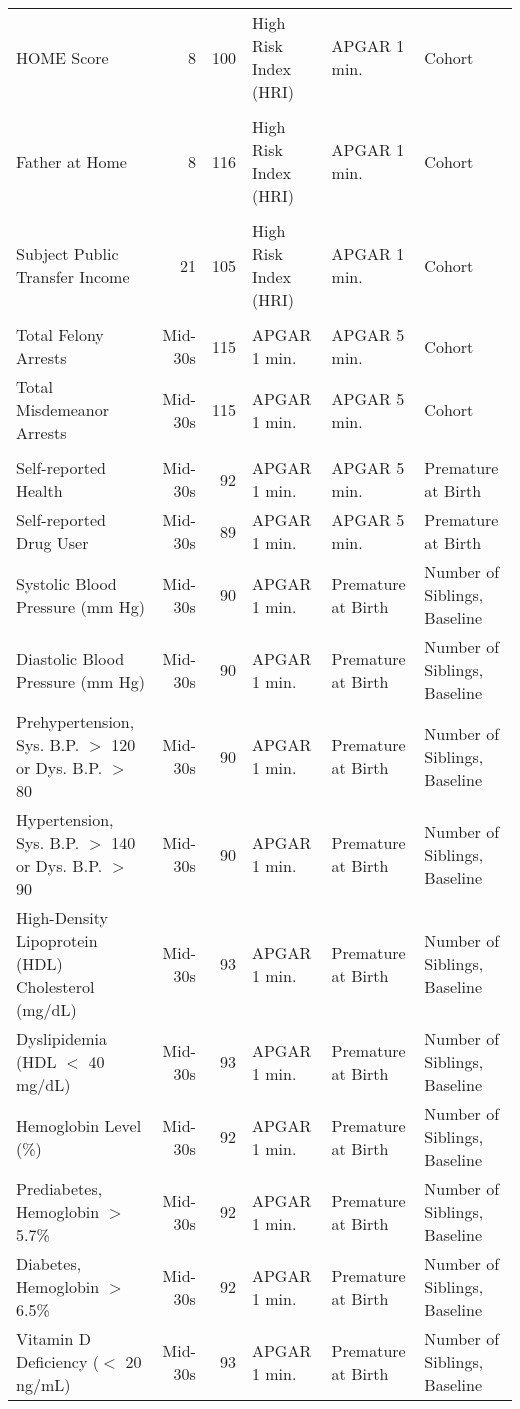 \begin{tabular}{l r r l l l}
\\
HOME Score				& 8		& 	100 & 	High Risk Index (HRI)	& APGAR 1 min.	&  Cohort \\
\\
Father at Home			& 8		& 	116 & 	High Risk Index (HRI)	& APGAR 1 min.	&  Cohort \\
\\
Subject Public Transfer Income	&	21	&	105	& High Risk Index (HRI) & APGAR 1 min. & Cohort \\
 \\
Total Felony Arrests		& Mid-30s	& 115 &	APGAR 1 min. & APGAR 5 min. & Cohort	\\
Total Misdemeanor Arrests	& Mid-30s	& 115 &	APGAR 1 min. & APGAR 5 min. & Cohort	\\
 \\
 Self-reported Health	&	Mid-30s	&	92	&	APGAR 1 min. & APGAR 5 min. & Premature at Birth	\\
 Self-reported Drug User	&	Mid-30s	&	89	&	APGAR 1 min. & APGAR 5 min. & Premature at Birth	\\
 Systolic Blood Pressure (mm Hg)	&	Mid-30s	&	90	&	APGAR 1 min. & Premature at Birth & Number of Siblings, Baseline	\\
 Diastolic Blood Pressure (mm Hg)	&	Mid-30s	 &	90	&	APGAR 1 min. & Premature at Birth & Number of Siblings, Baseline	\\
 Prehypertension, Sys. B.P. $>$ 120 or Dys. B.P. $>$ 80	&	Mid-30s	&	90	&	APGAR 1 min. & Premature at Birth & Number of Siblings, Baseline	\\
 Hypertension, Sys. B.P. $>$ 140 or Dys. B.P. $>$ 90	&	Mid-30s	&	90	&	APGAR 1 min. & Premature at Birth & Number of Siblings, Baseline	\\
 High-Density Lipoprotein (HDL) Cholesterol (mg/dL)	&	Mid-30s	&	93	&	APGAR 1 min. & Premature at Birth & Number of Siblings, Baseline	\\
 Dyslipidemia (HDL $<$ 40 mg/dL)	&	Mid-30s	&	93	&	APGAR 1 min. & Premature at Birth & Number of Siblings, Baseline	\\
 Hemoglobin Level (\%)	&	Mid-30s	&	92	&	APGAR 1 min. & Premature at Birth & Number of Siblings, Baseline	\\
 Prediabetes, Hemoglobin $>$ 5.7\%	&	Mid-30s	&	92	&	APGAR 1 min. & Premature at Birth & Number of Siblings, Baseline	\\
 Diabetes, Hemoglobin $>$ 6.5\%	&	Mid-30s	&	92	&	APGAR 1 min. & Premature at Birth & Number of Siblings, Baseline	\\
 Vitamin D Deficiency ($<$ 20 ng/mL)	&	Mid-30s	&	93	&	APGAR 1 min. & Premature at Birth & Number of Siblings, Baseline	\\

\end{tabular}

